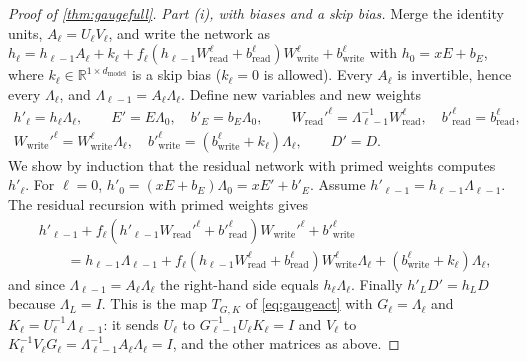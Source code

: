 \documentclass[10pt]{article}
\theoremstyle{definition}
\theoremstyle{remark}
\newcommand{\R}{\mathbb{R}}
\newcommand{\Wread}{W_{\mathrm{read}}}
\newcommand{\Wwrite}{W_{\mathrm{write}}}
\newcommand{\dm}{d_{\mathrm{model}}}
\begin{document}
\begin{proof}[Proof of \cref{thm:gaugefull}]
\emph{Part (i), with biases and a skip bias.} Merge the identity units, $A_\ell = U_\ell V_\ell$, and write the network as $h_\ell = h_{\ell-1}A_\ell + k_\ell + f_\ell(h_{\ell-1}\Wread^{\ell} + b^{\ell}_{\mathrm{read}})\Wwrite^{\ell} + b^{\ell}_{\mathrm{write}}$ with $h_0 = xE + b_E$, where $k_\ell \in \R^{1\times\dm}$ is a skip bias ($k_\ell = 0$ is allowed). Every $A_\ell$ is invertible, hence every $\Lambda_\ell$, and $\Lambda_{\ell-1} = A_\ell\Lambda_\ell$. Define new variables and new weights
\begin{gather*}
h'_\ell = h_\ell\Lambda_\ell,\qquad E' = E\Lambda_0,\quad b'_E = b_E\Lambda_0,\qquad
\Wread'^{\ell} = \Lambda_{\ell-1}^{-1}\Wread^{\ell},\quad b'^{\ell}_{\mathrm{read}} = b^{\ell}_{\mathrm{read}},\\
\Wwrite'^{\ell} = \Wwrite^{\ell}\Lambda_\ell,\quad b'^{\ell}_{\mathrm{write}} = (b^{\ell}_{\mathrm{write}} + k_\ell)\Lambda_\ell,\qquad
D' = D .
\end{gather*}
We show by induction that the residual network with primed weights computes $h'_\ell$. For $\ell = 0$, $h'_0 = (xE + b_E)\Lambda_0 = xE' + b'_E$. Assume $h'_{\ell-1} = h_{\ell-1}\Lambda_{\ell-1}$. The residual recursion with primed weights gives
\begin{align*}
&h'_{\ell-1} + f_\ell(h'_{\ell-1}\Wread'^{\ell} + b'^{\ell}_{\mathrm{read}})\Wwrite'^{\ell} + b'^{\ell}_{\mathrm{write}}\\
&\qquad= h_{\ell-1}\Lambda_{\ell-1} + f_\ell(h_{\ell-1}\Wread^{\ell} + b^{\ell}_{\mathrm{read}})\Wwrite^{\ell}\Lambda_\ell + (b^{\ell}_{\mathrm{write}} + k_\ell)\Lambda_\ell,
\end{align*}
and since $\Lambda_{\ell-1} = A_\ell\Lambda_\ell$ the right-hand side equals $h_\ell\Lambda_\ell$. Finally $h'_LD' = h_LD$ because $\Lambda_L = I$. This is the map $T_{G,K}$ of \cref{eq:gaugeact} with $G_\ell = \Lambda_\ell$ and $K_\ell = U_\ell^{-1}\Lambda_{\ell-1}$: it sends $U_\ell$ to $G_{\ell-1}^{-1}U_\ell K_\ell = I$ and $V_\ell$ to $K_\ell^{-1}V_\ell G_\ell = \Lambda_{\ell-1}^{-1}A_\ell\Lambda_\ell = I$, and the other matrices as above.


\end{proof}
\end{document}
